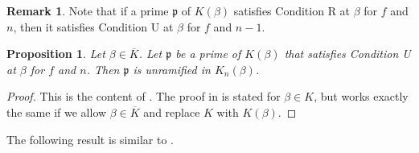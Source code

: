 \documentclass[11pt]{amsart}
\newtheorem{prop}[thm]{Proposition}
\theoremstyle{definition}
\theoremstyle{definition}
\newtheorem{rem}[thm]{Remark}
\numberwithin{thm}{section}
\numberwithin{equation}{thm}
\newcommand{\p}{\ensuremath{{\mathfrak{p}}}}
\newcommand{\fp}{\ensuremath{{\mathfrak{p}}}}
\newcommand{\Kbar}{\ensuremath {\overline K}}
\begin{document}
\begin{rem}
Note that if a prime $\fp$ of $K(\beta)$ satisfies Condition R at
  $\beta$ for $f$ and $n$, then it satisfies Condition U at $\beta$
  for $f$ and $n-1$.   
\end{rem}

\begin{prop}\label{necessary}
Let $\beta\in\Kbar$. Let $\p$ be a prime of $K(\beta)$ that satisfies
Condition U at $\beta$ for $f$ and $n$. 
Then $\fp$ is unramified in $K_n(\beta)$.
\end{prop}
\begin{proof}
This is the content of \cite[Proposition 3.1]{BridyTucker}. The proof in \cite{BridyTucker} is 
stated for $\beta\in K$, but works exactly the same if we allow $\beta\in\Kbar$ and replace $K$ with $K(\beta)$.
\end{proof}

The following result is similar to \cite[Proposition~6.5]{BT2}.
\end{document}
